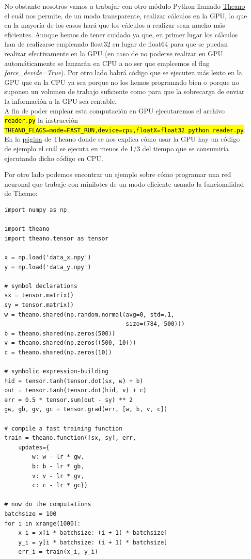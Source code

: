 \documentclass[10pt,a4paper]{article}
\newcommand{\code}[1]{\sethlcolor{light-gray}\hl{\texttt{#1}}} %
\newcommand{\archive}[1]{\sethlcolor{light-green}\hl{\texttt{#1}}} %
\begin{document}
No obstante nosotros vamos a trabajar con otro módulo Python llamado \href{http://deeplearning.net/software/theano/index.html}{Theano} el cuál nos permite, de un modo transparente, realizar cálculos en la GPU, lo que en la mayoría de los casos hará que los cálculos a realizar sean mucho más eficientes. Aunque hemos de tener cuidado ya que, en primer lugar los cálculos han de realizarse empleando float32 en lugar de float64 para que se puedan realizar efectivamente en la GPU (en caso de no poderse realizar en GPU automáticamente se lanzarán en CPU a no ser que empleemos el flag \textit{force\_devide=True}). Por otro lado habrá código que se ejecuten más lento en la GPU que en la CPU ya sea porque no los hemos programado bien o porque no suponen un volumen de trabajo suficiente como para que la sobrecarga de enviar la información a la GPU sea rentable.\\

A fin de poder emplear esta computación en GPU ejecutaremos el archivo \archive{reader.py} la instrucción \code{THEANO\_FLAGS=mode=FAST\_RUN,device=cpu,floatX=float32 python reader.py}.\\

En la \href{http://deeplearning.net/software/theano/tutorial/using_gpu.html}{página} de Theano donde se nos explica cómo usar la GPU hay un código de ejemplo el cuál se ejecuta en menos de 1/3 del tiempo que se consumiría ejecutando dicho código en CPU.

Por otro lado podemos encontrar un ejemplo sobre cómo programar una red neuronal que trabaje con minilotes de un modo eficiente usando la funcionalidad de Theano:

\begin{lstlisting}
import numpy as np

import theano
import theano.tensor as tensor

x = np.load('data_x.npy')
y = np.load('data_y.npy')

# symbol declarations
sx = tensor.matrix()
sy = tensor.matrix()
w = theano.shared(np.random.normal(avg=0, std=.1,
                                   size=(784, 500)))
b = theano.shared(np.zeros(500))
v = theano.shared(np.zeros((500, 10)))
c = theano.shared(np.zeros(10))

# symbolic expression-building
hid = tensor.tanh(tensor.dot(sx, w) + b)
out = tensor.tanh(tensor.dot(hid, v) + c)
err = 0.5 * tensor.sum(out - sy) ** 2
gw, gb, gv, gc = tensor.grad(err, [w, b, v, c])

# compile a fast training function
train = theano.function([sx, sy], err,
    updates={
        w: w - lr * gw,
        b: b - lr * gb,
        v: v - lr * gv,
        c: c - lr * gc})

# now do the computations
batchsize = 100
for i in xrange(1000):
    x_i = x[i * batchsize: (i + 1) * batchsize]
    y_i = y[i * batchsize: (i + 1) * batchsize]
    err_i = train(x_i, y_i)
\end{lstlisting}
\end{document}
